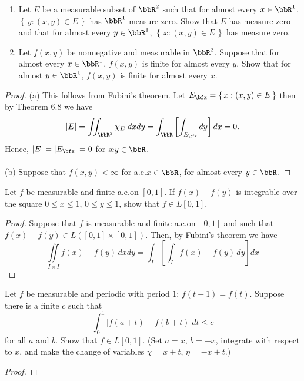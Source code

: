 
\begin{problem}
\begin{enumerate}[label=(\alph*)]
\item Let $E$ be a measurable subset of $\bbR^2$ such that for almost every
  $x\in\bbR^1$, $\left\{\,y:(x,y)\in E\,\right\}$ has
  $\bbR^1$-measure zero. Show that $E$ has measure zero and that for almost
  every $y\in\bbR^1$, $\left\{\,x:(x,y)\in E\,\right\}$ has
  measure zero.
\item Let $f(x,y)$ be nonnegative and measurable in $\bbR^2$. Suppose that
  for almost every $x\in\bbR^1$, $f(x,y)$ is finite for almost every
  $y$. Show that for almost $y\in\bbR^1$, $f(x,y)$ is finite for almost
  every $x$.
\end{enumerate}
\end{problem}
\begin{proof}
(a) This follows from Fubini's theorem. Let $E_\bfx=\left\{\,x:(x,y)\in
  E\,\right\}$ then by Theorem 6.8 we have
\begin{equation}
\label{eq:application-of-fubini}
|E|=\iint_{\bbR^2}\chi_E\;dxdy=\int_\bbR\left[\int_{E_\bfx} dy\right]dx=0.
\end{equation}
Hence, $|E|=\left|E_\bfx\right|=0$ for æ\@ $y\in\bbR$.
\\\\
(b) Suppose that $f(x,y)<\infty$ for a.e.\@ $x\in\bbR$, for almost every $y\in\bbR$.
\end{proof}
\newpage

\begin{problem}
Let $f$ be measurable and finite a.e.\@ on $[0,1]$. If $f(x)-f(y)$ is
integrable over the square $0\leq x\leq 1$, $0\leq y\leq 1$, show that
$f\in L[0,1]$.
\end{problem}
\begin{proof}
Suppose that $f$ is measurable and finite a.e.\@ on $[0,1]$ and such that
$f(x)-f(y)\in L([0,1]\times[0,1])$. Then, by Fubini's theorem we have
\begin{equation}
\label{eq:consequence-of-fubini}
\iint\limits_{I\times I}f(x)-f(y)\,dxdy=\int_I\left[\int_I f(x)-f(y)\,dy\right]dx
\end{equation}
\end{proof}
\newpage

\begin{problem}
Let $f$ be measurable and periodic with period $1$: $f(t+1)=f(t)$. Suppose
there is a finite $c$ such that
\[
\int_0^1\left|f(a+t)-f(b+t)\right|dt\leq c
\]
for all $a$ and $b$. Show that $f\in L[0,1]$. (Set $a=x$, $b=-x$, integrate
with respect to $x$, and make the change of variables $\chi=x+t$,
$\eta=-x+t$.)
\end{problem}
\begin{proof}
\end{proof}
\newpage

